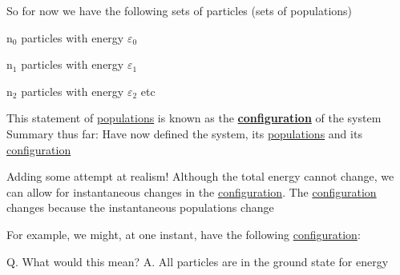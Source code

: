 \documentclass[ignorenonframetext]{beamer}
\begin{document}
\begin{frame}[allowframebreaks]
So for now we have the following sets of particles (sets of populations)\newline
 
n\(_0\) particles with energy \(\varepsilon_0\)\newline
 
n\(_1\) particles with energy \(\varepsilon_1\)\newline
 
n\(_2\) particles with energy \(\varepsilon_2\)    etc\newline
 
This statement of \underline{populations} is known as the \underline{\textbf{configuration}} of the system\newline
Summary thus far:\newline
Have now defined the system, its \underline{populations} and its \underline{configuration}\newline
 
Adding some attempt at realism!\newline
Although the total energy cannot change, we can allow for instantaneous changes in the \underline{configuration}. 
The \underline{configuration} changes because the instantaneous populations change\newline

For example, we might, at one instant, have the following \underline{configuration}:\newline

\newline
 
Q. What would this mean? \newline
A. All particles are in the ground state for energy
\end{frame}
\end{document}
